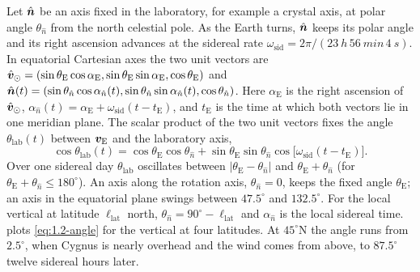 Let $\hat{\bm{n}}$ be an axis fixed in the laboratory, for example a crystal axis, at polar angle $\theta_{\hat{n}}$ from the north celestial pole. As the Earth turns, $\hat{\bm{n}}$ keeps its polar angle and its right ascension advances at the sidereal rate $\omega_{\mathrm{sid}} = 2\pi/(\SI{23}{h}\,\SI{56}{min}\,\SI{4}{s})$. In equatorial Cartesian axes the two unit vectors are $\hat{\bm{v}}_\odot = (\sin\theta_{\mathrm{E}}\cos\alpha_{\mathrm{E}}, \sin\theta_{\mathrm{E}}\sin\alpha_{\mathrm{E}}, \cos\theta_{\mathrm{E}})$ and $\hat{\bm{n}}(t) = (\sin\theta_{\hat{n}}\cos\alpha_{\hat{n}}(t), \sin\theta_{\hat{n}}\sin\alpha_{\hat{n}}(t), \cos\theta_{\hat{n}})$. Here $\alpha_{\mathrm{E}}$ is the right ascension of $\hat{\bm{v}}_\odot$, $\alpha_{\hat{n}}(t) = \alpha_{\mathrm{E}} + \omega_{\mathrm{sid}}(t - t_{\mathrm{E}})$, and $t_{\mathrm{E}}$ is the time at which both vectors lie in one meridian plane. The scalar product of the two unit vectors fixes the angle $\theta_{\mathrm{lab}}(t)$ between $\bm{v}_{\mathrm{E}}$ and the laboratory axis,
\begin{equation}
  \cos\theta_{\mathrm{lab}}(t) = \cos\theta_{\mathrm{E}}\cos\theta_{\hat{n}} + \sin\theta_{\mathrm{E}}\sin\theta_{\hat{n}} \cos\bigl[\omega_{\mathrm{sid}}(t - t_{\mathrm{E}})\bigr].
  \label{eq:1.2-angle}
\end{equation}
Over one sidereal day $\theta_{\mathrm{lab}}$ oscillates between $|\theta_{\mathrm{E}} - \theta_{\hat{n}}|$ and $\theta_{\mathrm{E}} + \theta_{\hat{n}}$ (for $\theta_{\mathrm{E}} + \theta_{\hat{n}} \le 180^\circ$). An axis along the rotation axis, $\theta_{\hat{n}} = 0$, keeps the fixed angle $\theta_{\mathrm{E}}$; an axis in the equatorial plane swings between $47.5^\circ$ and $132.5^\circ$. For the local vertical at latitude $\ell_{\mathrm{lat}}$ north, $\theta_{\hat{n}} = 90^\circ - \ell_{\mathrm{lat}}$ and $\alpha_{\hat{n}}$ is the local sidereal time.  plots \cref{eq:1.2-angle} for the vertical at four latitudes. At $45^\circ$N the angle runs from $2.5^\circ$, when Cygnus is nearly overhead and the wind comes from above, to $87.5^\circ$ twelve sidereal hours later.

